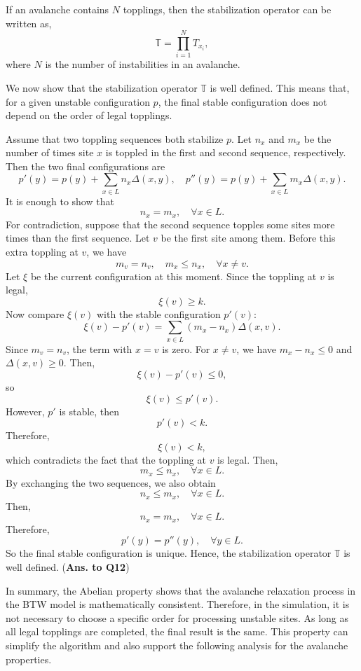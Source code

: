 If an avalanche contains $N$ topplings, then the stabilization operator can be written as, 
$$
\mathbb{T}=\prod_{i=1}^{N}T_{x_i},
$$
where $N$ is the number of instabilities in an avalanche.

We now show that the stabilization operator $\mathbb{T}$ is well defined. This means that, for a given unstable configuration $p$, the final stable configuration does not depend on the order of legal topplings.

Assume that two toppling sequences both stabilize $p$. Let $n_x$ and $m_x$ be the number of times site $x$ is toppled in the first and second sequence, respectively. Then the two final configurations are
$$
p'(y)=p(y)+\sum_{x\in L} n_x\Delta(x,y), \quad p''(y)=p(y)+\sum_{x\in L} m_x\Delta(x,y).
$$
It is enough to show that
$$
n_x=m_x, \quad \forall x\in L.
$$
For contradiction, suppose that the second sequence topples some sites more times than the first sequence. Let $v$ be the first site among them. Before this extra toppling at $v$, we have
$$
m_v=n_v,
\quad
m_x\le n_x, \quad \forall x\neq v.
$$
Let $\xi$ be the current configuration at this moment. Since the toppling at $v$ is legal,
$$
\xi(v)\ge k.
$$
Now compare $\xi(v)$ with the stable configuration $p'(v)$:
$$
\xi(v)-p'(v)
=
\sum_{x\in L}(m_x-n_x)\Delta(x,v).
$$
Since $m_v=n_v$, the term with $x=v$ is zero. For $x\neq v$, we have $m_x-n_x\le0$ and $\Delta(x,v)\ge0$. Then,
$$
\xi(v)-p'(v)\le0,
$$
so
$$
\xi(v)\le p'(v).
$$
However, $p'$ is stable, then
$$
p'(v)<k.
$$
Therefore,
$$
\xi(v)<k,
$$
which contradicts the fact that the toppling at $v$ is legal. Then,
$$
m_x\le n_x, \quad \forall x\in L.
$$
By exchanging the two sequences, we also obtain
$$
n_x\le m_x, \quad \forall x\in L.
$$
Then,
$$
n_x=m_x, \quad \forall x\in L.
$$
Therefore,
$$
p'(y)=p''(y), \quad \forall y\in L.
$$
So the final stable configuration is unique. Hence, the stabilization operator $\mathbb{T}$ is well defined. (\textbf{Ans. to Q12})

In summary, the Abelian property shows that the avalanche relaxation process in the BTW model is mathematically consistent. Therefore, in the simulation, it is not necessary to choose a specific order for processing unstable sites. As long as all legal topplings are completed, the final result is the same. This property can simplify the algorithm and also support the following analysis for the avalanche properties. 